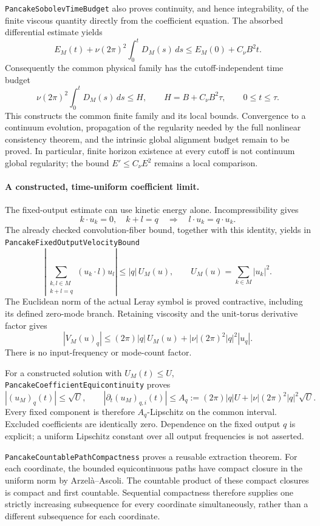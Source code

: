 \documentclass[11pt]{article}
\theoremstyle{definition}
\begin{document}
\texttt{PancakeSobolevTimeBudget} also proves continuity, and hence
integrability, of the finite viscous quantity directly from the
coefficient equation. The absorbed differential estimate yields
\[
 E_M(t)+\nu(2\pi)^2\int_0^t D_M(s)\,ds
       \le E_M(0)+C_\nu B^2t .
\]
Consequently the common physical family has the cutoff-independent
time budget
\[
 \nu(2\pi)^2\int_0^t D_M(s)\,ds
       \le H,\qquad H=B+C_\nu B^2\tau,\qquad 0\le t\le\tau .
\]
This constructs the common finite family and its local bounds.
Convergence to a continuum evolution, propagation of the regularity
needed by the full nonlinear consistency theorem, and the intrinsic
global alignment budget remain to be proved. In particular, finite
horizon existence at every cutoff is not continuum global regularity;
the bound $E'\le C_\nu E^2$ remains a local comparison.

\paragraph{A constructed, time-uniform coefficient limit.}
The fixed-output estimate can use kinetic energy alone.
Incompressibility gives
\[
 k\cdot u_k=0,\quad k+l=q
 \quad\Longrightarrow\quad
 l\cdot u_k=q\cdot u_k .
\]
The already checked convolution-fiber bound, together with this
identity, yields in \texttt{PancakeFixedOutputVelocityBound}
\[
 \left|\sum_{\substack{k,l\in M\\k+l=q}}(u_k\cdot l)u_l\right|
       \le |q|\,U_M(u),\qquad U_M(u)=\sum_{k\in M}|u_k|^2 .
\]
The Euclidean norm of the actual Leray symbol is proved contractive,
including its defined zero-mode branch. Retaining viscosity and the
unit-torus derivative factor gives
\[
 |V_M(u)_q|
   \le (2\pi)|q|\,U_M(u)
         +|\nu|(2\pi)^2|q|^2|u_q|.
\]
There is no input-frequency or mode-count factor.

For a constructed solution with $U_M(t)\le U$,
\texttt{PancakeCoefficientEquicontinuity} proves
\[
 |(u_M)_q(t)|\le\sqrt U,\qquad
 |\partial_t(u_M)_{q,i}(t)|
   \le A_q:=(2\pi)|q|U+|\nu|(2\pi)^2|q|^2\sqrt U .
\]
Every fixed component is therefore $A_q$-Lipschitz on the common
interval. Excluded coefficients are identically zero. Dependence
on the fixed output $q$ is explicit; a uniform Lipschitz constant
over all output frequencies is not asserted.

\texttt{PancakeCountablePathCompactness} proves a reusable extraction
theorem. For each coordinate, the bounded equicontinuous paths have
compact closure in the uniform norm by Arzel\`a--Ascoli. The countable
product of these compact closures is compact and first countable.
Sequential compactness therefore supplies one strictly increasing
subsequence for every coordinate simultaneously, rather than a
different subsequence for each coordinate.
\end{document}
